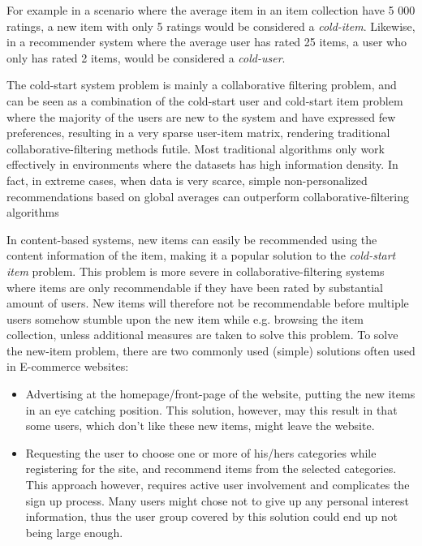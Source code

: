 For example in a scenario where the average item in an item collection have 5 000 ratings, a new item with only 5 ratings would be considered a \emph{cold-item}. Likewise, in a recommender system where the average user has rated 25 items, a user who only has rated 2 items, would be considered a \emph{cold-user}.

The cold-start system problem is mainly a collaborative filtering problem, and
can be seen as a combination of the cold-start user and cold-start item problem
where the majority of the users are new to the system and have expressed few
preferences, resulting in a very sparse user-item matrix, rendering traditional collaborative-filtering methods futile. Most traditional algorithms only work effectively in environments where the datasets has high information density. In fact, in extreme cases, when data
is very scarce, simple non-personalized recommendations based on global
averages can outperform collaborative-filtering algorithms \cite{Park2006}

In content-based systems, new items can easily be
recommended using the content information of the item, making it a popular
solution to the \emph{cold-start item} problem. This problem is more
severe in collaborative-filtering systems where items are only recommendable if
they have been rated by substantial amount of users. New items will therefore not be
recommendable before multiple users somehow stumble upon the new item while
e.g. browsing the item collection, unless additional measures are taken to
solve this problem. To solve the new-item problem, there are two commonly used (simple) solutions often used in E-commerce websites:

\begin{itemize}ollaborative filtering
\item Advertising at the homepage/front-page of the website, putting the new
items in an eye catching position. This solution, however, may this result in
that some users, which don't like these new items, might leave the website.
\item Requesting the user to choose one or more of his/hers categories while
registering for the site, and recommend items from the selected categories.
This approach however, requires active user involvement and complicates the
sign up process. Many users might chose not to give up any
personal interest information, thus the user group covered by this solution could end up not being large enough.
\end{itemize}

